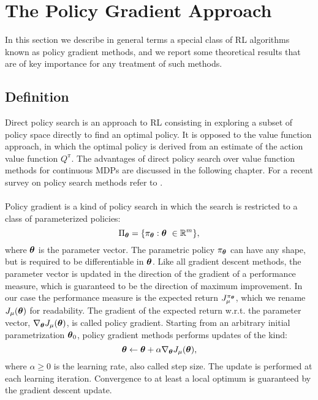 \section{The Policy Gradient Approach}
	In this section we describe in general terms a special class of \ac{RL} algorithms known as policy gradient methods, and we report some theoretical results that are of key importance for any treatment of such methods.

\subsection{Definition}
Direct policy search is an approach to \ac{RL} consisting in exploring a subset of policy space directly to find an optimal policy. It is opposed to the value function approach, in which the optimal policy is derived from an estimate of the action value function $Q^\pi$. The advantages of direct policy search over value function methods for continuous \ac{MDP}s are discussed in the following chapter. For a recent survey on policy search methods refer to \cite{deisenroth2013survey}.

\paragraph{} %
Policy gradient is a kind of policy search in which the search is restricted to a class of parameterized policies:  
\[
	\Pi_{\boldsymbol{\theta}} = \{\pi_{\boldsymbol{\theta}}:\boldsymbol{\theta}\ \in \mathbb{R}^m\},
\]
where $\boldsymbol{\theta}$ is the parameter vector. The parametric policy $\pi_{\boldsymbol{\theta}}$ can have any shape, but is required to be differentiable in $\boldsymbol{\theta}$. Like all gradient descent methods, the parameter vector is updated in the direction of the gradient of a performance measure, which is guaranteed to be the direction of maximum improvement. In our case the performance measure is the expected return $J_{\mu}^{\pi_{\boldsymbol{\theta}}}$, which we rename $J_{\mu}(\boldsymbol{\theta})$ for readability. The gradient of the expected return w.r.t. the parameter vector, $\nabla_{\boldsymbol{\theta}}J_\mu(\boldsymbol{\theta})$, is called policy gradient. Starting from an arbitrary initial parametrization $\boldsymbol{\theta}_0$, policy gradient methods performs updates of the kind: 
\[
	\boldsymbol{\theta} \gets \boldsymbol{\theta} + \alpha\nabla_{\boldsymbol{\theta}}J_\mu(\boldsymbol{\theta}),
\]
where $\alpha \geq 0$ is the learning rate, also called step size. The update is performed at each learning iteration.
Convergence to at least a local optimum is guaranteed by the gradient descent update.

